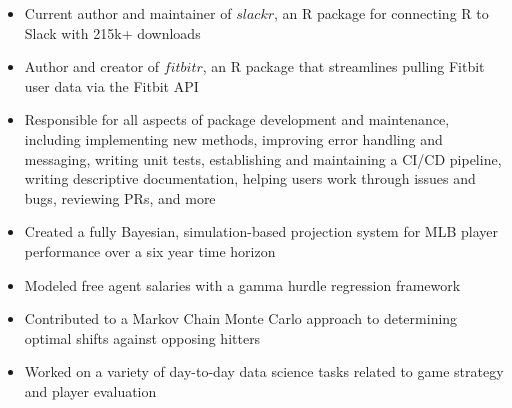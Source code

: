 \documentclass[10pt,a4paper,ragged2e,withhyper]{/Users/matt/documents/GitHub/mrkaye97.github.io/resume/altacv}
\begin{document}
\begin{paracol}{1}
		\begin{itemize}
		\item Current author and maintainer of $slackr$, an R package for connecting R to Slack with 215k+ downloads
		\item Author and creator of $fitbitr$, an R package that streamlines pulling Fitbit user data via the Fitbit API
		\item Responsible for all aspects of package development and maintenance, including implementing new methods, improving error handling and messaging, writing unit tests, establishing and maintaining a CI/CD pipeline, writing descriptive documentation, helping users work through issues and bugs, reviewing PRs, and more
		\end{itemize}
		
		\divider

		\begin{itemize}
		\item Created a fully Bayesian, simulation-based projection system for MLB player performance over a six year time horizon
		\item Modeled free agent salaries with a gamma hurdle regression framework
		\item Contributed to a Markov Chain Monte Carlo approach to determining optimal shifts against opposing hitters
		\item Worked on a variety of day-to-day data science tasks related to game strategy and player evaluation
		\end{itemize}

		
%		
%		
%		
%		
		

		
		
		
		
		
	\end{paracol}
	
	
\end{document}
